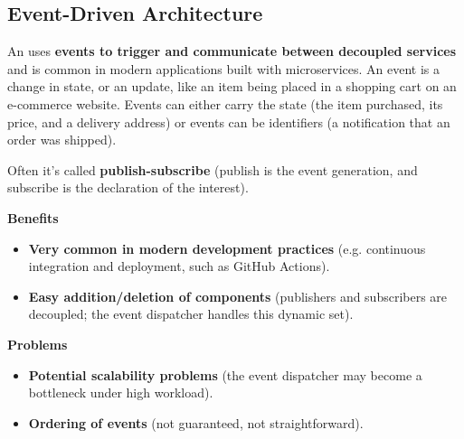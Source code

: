 \subsection{Event-Driven Architecture}

An  uses \textbf{events to trigger and communicate between decoupled services} and is common in modern applications built with microservices. An event is a change in state, or an update, like an item being placed in a shopping cart on an e-commerce website. Events can either carry the state (the item purchased, its price, and a delivery address) or events can be identifiers (a notification that an order was shipped).

Often it's called \textbf{publish-subscribe} (publish is the event generation, and subscribe is the declaration of the interest).

\begin{flushleft}
    \textcolor{Green3}{\textbf{ Benefits}}
\end{flushleft}
\begin{itemize}
    \item \textbf{Very common in modern development practices} (e.g. continuous integration and deployment, such as GitHub Actions).

    \item \textbf{Easy addition/deletion of components} (publishers and subscribers are decoupled; the event dispatcher handles this dynamic set).
\end{itemize}

\begin{flushleft}
    \textcolor{Red2}{\textbf{ Problems}}
\end{flushleft}
\begin{itemize}
    \item \textbf{Potential scalability problems} (the event dispatcher may become a bottleneck under high workload).
    
    \item \textbf{Ordering of events} (not guaranteed, not straightforward).
\end{itemize}

